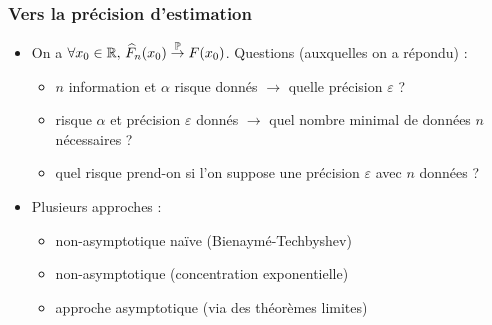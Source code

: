 \begin{frame}
\frametitle{Vers la précision d'estimation}
\begin{itemize}
\item On a $\forall x_0 \in \operatorname{{\mathbb R}},\,\widehat F_n(x_0)\stackrel{\operatorname{{\mathbb P}}}{\rightarrow} F(x_0)$.
\alert{Questions (auxquelles on a répondu)} :
\begin{itemize}
\item $n$ \alert{information} et $\alpha$ \alert{risque} donnés $\rightarrow$ quelle  \alert{précision} $\varepsilon$ ?
\item risque $\alpha$ et précision $\varepsilon$ donnés $\rightarrow$ quel nombre minimal de données $n$ nécessaires ?
\item quel risque prend-on si l'on suppose une précision $\varepsilon$ avec $n$ données ?
\end{itemize}

\item Plusieurs approches :
\begin{itemize}
\item non-asymptotique naïve (Bienaymé-Techbyshev)
\item non-asymptotique (concentration exponentielle)
\item approche asymptotique (via des théorèmes limites)
\end{itemize}
\end{itemize}
\end{frame}

